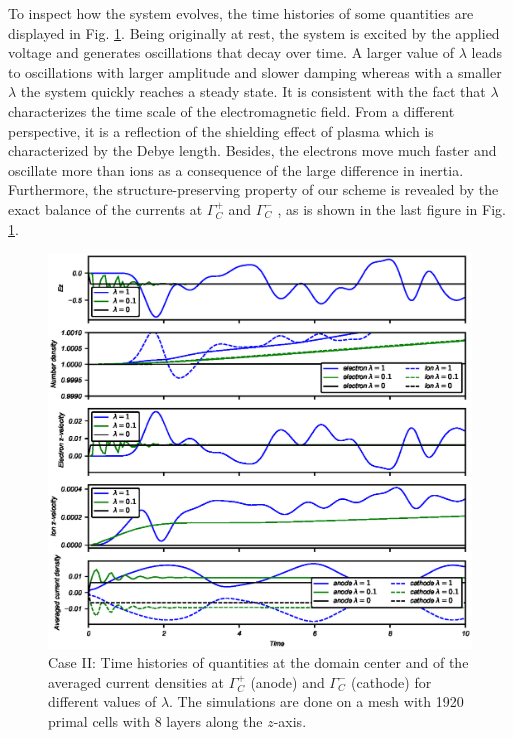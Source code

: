 \documentclass{article}
\begin{document}
To inspect how the system evolves, the time histories of some quantities are displayed in Fig. \ref{fig:origin-data_vs_time}. Being originally at rest, the system is excited by the applied voltage and generates oscillations that decay over time. A larger value of $\lambda$ leads to oscillations with larger amplitude and slower damping whereas with a smaller $\lambda$ the system quickly reaches a steady state. It is consistent with the fact that $\lambda$ characterizes the time scale of the electromagnetic field. From a different perspective, it is a reflection of the shielding effect of plasma which is characterized by the Debye length. Besides, the electrons move much faster and oscillate more than ions as a consequence of the large difference in inertia. Furthermore, the structure-preserving property of our scheme is revealed by the exact balance of the currents at $\Gamma^+_C$ and $\Gamma^-_C$ \cite{Hiptmair_2021}, as is shown in the last figure in Fig. \ref{fig:origin-data_vs_time}.

\begin{figure}
    \centering
    \includegraphics[scale=0.9]{data-vs-time_stepVoltage.eps}
    \caption{Case II: Time histories of quantities at the domain center and of the averaged current densities at $\Gamma^+_C$ (anode) and $\Gamma^-_C$ (cathode) for different values of $\lambda$. The simulations are done on a mesh with 1920 primal cells with 8 layers along the $z$-axis.}
    \label{fig:origin-data_vs_time}
\end{figure}
\end{document}
